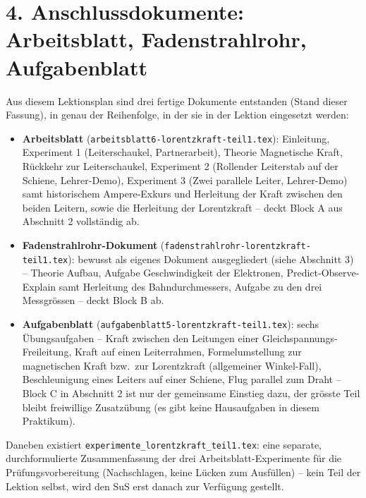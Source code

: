 \documentclass[11pt,a4paper]{article}
\begin{document}
\section*{4. Anschlussdokumente: Arbeitsblatt, Fadenstrahlrohr,
Aufgabenblatt}

Aus diesem Lektionsplan sind drei fertige Dokumente entstanden (Stand
dieser Fassung), in genau der Reihenfolge, in der sie in der Lektion
eingesetzt werden:

\begin{itemize}[leftmargin=1.2cm,itemsep=0.4em]
  \item \textbf{Arbeitsblatt}
  (\texttt{arbeitsblatt6-lorentzkraft-teil1.tex}): Einleitung, Experiment
  1 (Leiterschaukel, Partnerarbeit), Theorie Magnetische Kraft, Rückkehr
  zur Leiterschaukel, Experiment 2 (Rollender Leiterstab auf der Schiene,
  Lehrer-Demo), Experiment 3 (Zwei parallele Leiter, Lehrer-Demo) samt
  historischem Ampere-Exkurs und Herleitung der Kraft zwischen den beiden
  Leitern, sowie die Herleitung der Lorentzkraft -- deckt Block A aus
  Abschnitt 2 vollständig ab.
  \item \textbf{Fadenstrahlrohr-Dokument}
  (\texttt{fadenstrahlrohr-lorentzkraft-teil1.tex}): bewusst als eigenes
  Dokument ausgegliedert (siehe Abschnitt 3) -- Theorie Aufbau, Aufgabe
  Geschwindigkeit der Elektronen, Predict-Observe-Explain samt Herleitung
  des Bahndurchmessers, Aufgabe zu den drei Messgrössen -- deckt Block B
  ab.
  \item \textbf{Aufgabenblatt}
  (\texttt{aufgabenblatt5-lorentzkraft-teil1.tex}): sechs
  Übungsaufgaben -- Kraft zwischen den Leitungen einer
  Gleichspannungs-Freileitung, Kraft auf einen Leiterrahmen,
  Formelumstellung zur magnetischen Kraft bzw.\ zur Lorentzkraft
  (allgemeiner Winkel-Fall), Beschleunigung eines Leiters auf einer
  Schiene, Flug parallel zum Draht -- Block C in Abschnitt 2 ist nur der
  gemeinsame Einstieg dazu, der grösste Teil bleibt freiwillige
  Zusatzübung (es gibt keine Hausaufgaben in diesem Praktikum).
\end{itemize}

Daneben existiert \texttt{experimente\_lorentzkraft\_teil1.tex}: eine
separate, durchformulierte Zusammenfassung der drei
Arbeitsblatt-Experimente für die Prüfungsvorbereitung (Nachschlagen,
keine Lücken zum Ausfüllen) -- kein Teil der Lektion selbst, wird den SuS
erst danach zur Verfügung gestellt.

\end{document}
